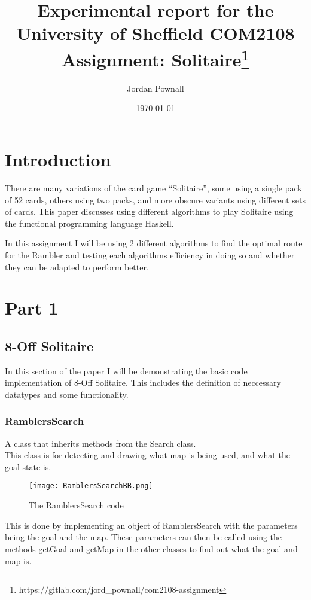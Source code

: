 \documentclass[11pt,oneside]{article}
\title{Experimental report for the University of Sheffield COM2108 Assignment: Solitaire\footnote{https://gitlab.com/jord_pownall/com2108-assignment}}
\author{Jordan Pownall}
\date{\today}
\begin{document}
\maketitle

\section{Introduction}

There are many variations of the card game “Solitaire”, some using a single pack of 52 cards, others using two packs, and more obscure variants using different sets of cards. 
This paper discusses using different algorithms to play Solitaire using the functional programming language Haskell.

In this assignment I will be using 2 different algorithms to find the optimal route for the Rambler and testing each algorithms efficiency in doing so and whether they can be adapted to perform better.


\section{Part 1}

\subsection{8-Off Solitaire}

In this section of the paper I will be demonstrating the basic code implementation of 8-Off Solitaire. This includes the definition of neccessary datatypes and some functionality.

\subsubsection{RamblersSearch}
A class that inherits methods from the Search class. \\This class is for detecting and drawing what map is being used, and what the goal state is. 

\begin{figure}[!ht]
\centering
  \texttt{[image: RamblersSearchBB.png]}
  \caption{The RamblersSearch code}
  \label{fig:RamblersSearchBB}
\end{figure}

This is done by implementing an object of RamblersSearch with the parameters being the goal and the map. These parameters can then be called using the methods getGoal and getMap in the other classes to find out what the goal and map is.
\end{document}
